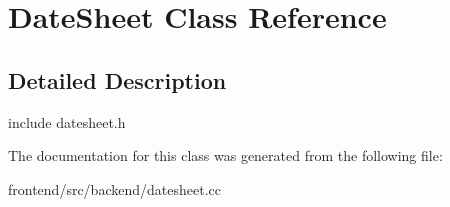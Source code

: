 \hypertarget{classDateSheet}{\section{Date\-Sheet Class Reference}
\label{classDateSheet}
}


\subsection{Detailed Description}
include datesheet.\-h 

The documentation for this class was generated from the following file\-:\begin{DoxyCompactItemize}
\item 
frontend/src/backend/datesheet.\-cc\end{DoxyCompactItemize}
